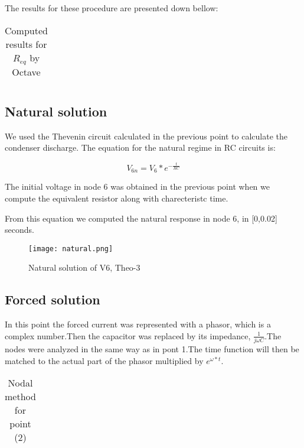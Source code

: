 The results for these procedure are presented down bellow: 

\vspace{0.2cm}
\FloatBarrier
\begin{table}[h]
  \centering
  \begin{tabular}{|c|c|c|c|c|c|c|}
	\hline
    
	\hline
  \end{tabular}
  \caption{Computed results for $R_{eq}$  by Octave }
  \label{tab:nodal}
\end{table}
\FloatBarrier 
  

\subsection{Natural solution} 

We used the Thevenin circuit calculated in the previous point to calculate the condenser discharge. The equation for the natural regime in RC circuits is: 

\begin{equation}
  V_{6n}=V_6*e^{-\frac{t}{RC}}
  \label{eq:kvl}
\end{equation}   

The initial voltage in node 6 was obtained in the previous point when we compute the equivalent resistor along with charecteristc time. 

From this equation we computed the natural response in node 6, in [0,0.02] seconds.  
\FloatBarrier
\begin{figure}
  \texttt{[image: natural.png]}
  \caption{Natural solution of V6, Theo-3}
  \label{fig:natural}
\end{figure}
\FloatBarrier

\subsection{Forced solution} 

In this point the forced current was represented with a phasor, which is a complex number.Then the capacitor was replaced by its impedance, $\frac{1}{j\omega C}$.The nodes were analyzed in the same way as in pont 1.The time function will then be matched to the actual part of the phasor multiplied by $e^{\omega*t}$. 


\vspace{0.2cm}
\FloatBarrier
\begin{table}[h]
  \centering
  \begin{tabular}{|c|c|}
   \hline
    
	\hline
  \end{tabular}
  \caption{Nodal method for point (2)}
  \label{tab:nodal}
\end{table}
\FloatBarrier  



